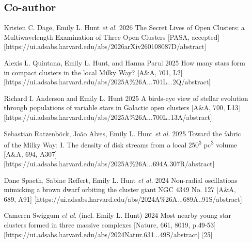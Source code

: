 \subsection*{Co-author}

\begin{etaremune}
    \item \publication 
        {Kristen C. Dage, Emily L. Hunt \emph{et al.}}
        {2026}
        {The Secret Lives of Open Clusters: a Multiwavelength Examination of Three Open Clusters}
        [PASA, accepted]
        [https://ui.adsabs.harvard.edu/abs/2026arXiv260108087D/abstract]
    \item \publication 
        {Alexis L. Quintana, Emily L. Hunt, and Hanna Parul}
        {2025}
        {How many stars form in compact clusters in the local Milky Way?}
        [A\&A, 701, L2]
        [https://ui.adsabs.harvard.edu/abs/2025A\%26A...701L...2Q/abstract]
    \item \publication 
        {Richard I. Anderson and Emily L. Hunt}
        {2025}
        {A birds-eye view of stellar evolution through populations of variable stars in Galactic open clusters}
        [A\&A, 700, L13]
        [https://ui.adsabs.harvard.edu/abs/2025A\%26A...700L..13A/abstract]
    \item \publication 
        {Sebastian Ratzenböck, João Alves, Emily L. Hunt \emph{et al.}}
        {2025}
        {Toward the fabric of the Milky Way: I. The density of disk streams from a local 250\textsuperscript{3} pc\textsuperscript{3} volume}
        [A\&A, 694, A307]
        [https://ui.adsabs.harvard.edu/abs/2025A\%26A...694A.307R/abstract]
    \item \publication
        {Dane Spaeth, Sabine Reffert, Emily L. Hunt \emph{et al.}}
        {2024}
        {Non-radial oscillations mimicking a brown dwarf orbiting the cluster giant NGC 4349 No. 127}
        [A\&A, 689, A91]
        [https://ui.adsabs.harvard.edu/abs/2024A\%26A...689A..91S/abstract]
    \item \publication
        {Cameren Swiggum \emph{et al.} (incl. Emily L. Hunt)}
        {2024}
        {Most nearby young star clusters formed in three massive complexes }
        [Nature, 661, 8019, p.49-53]
        [https://ui.adsabs.harvard.edu/abs/2024Natur.631...49S/abstract]
        [25]
\end{etaremune}
